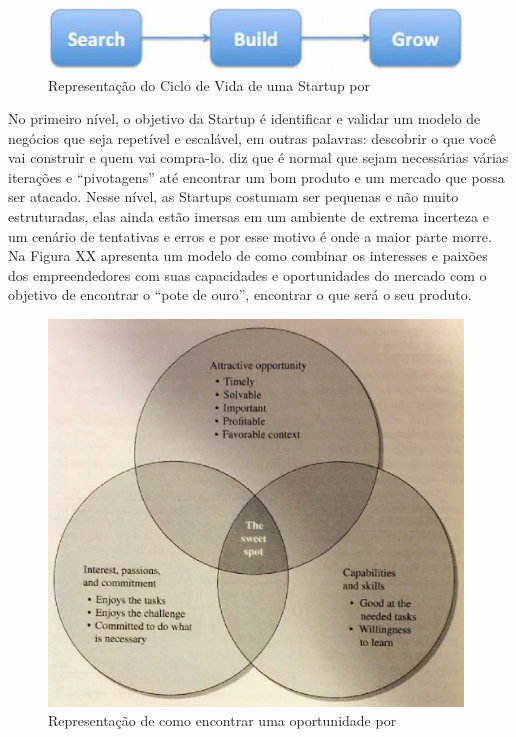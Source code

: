\begin{figure}[!htb]
\centering
\includegraphics[width=11cm,angle=0]{figuras/ciclo_de_vida_steve_blank02}
\caption{Representação do Ciclo de Vida de uma Startup por \cite{Blank2015}}
\label{Rotulo}
\end{figure}

No primeiro nível, o objetivo da Startup é identificar e validar um modelo de negócios que seja repetível e escalável, em outras palavras: descobrir o que você vai construir e quem vai compra-lo.  diz que é normal que sejam necessárias várias iterações e ``pivotagens'' até encontrar um bom produto e um mercado que possa ser atacado. Nesse nível, as Startups costumam ser pequenas e não muito estruturadas, elas ainda estão imersas em um ambiente de extrema incerteza e um cenário de tentativas e erros e por esse motivo é onde a maior parte morre. Na Figura XX  apresenta um modelo de como combinar os interesses e paixões dos empreendedores com suas capacidades e oportunidades do mercado com o objetivo de encontrar o ``pote de ouro'', encontrar o que será o seu produto.

\begin{figure}[!htb]
\centering
\includegraphics[width=11cm,angle=0]{figuras/the_sweet_spot_byers}
\caption{Representação de como encontrar uma oportunidade por \cite{Byers2014}}
\label{Rotulo}
\end{figure}


